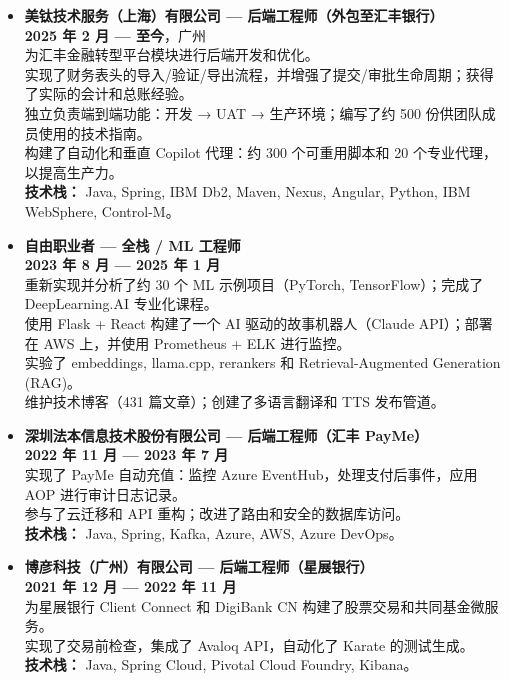 \documentclass[11pt, a4paper]{latex/awesome-cv}
\begin{document}
\Large
\begin{itemize}
    \item \textbf{美钛技术服务（上海）有限公司 — 后端工程师（外包至汇丰银行）} \\
    \textbf{2025 年 2 月 — 至今}，广州 \\
    为汇丰金融转型平台模块进行后端开发和优化。\\
    实现了财务表头的导入/验证/导出流程，并增强了提交/审批生命周期；获得了实际的会计和总账经验。\\
    独立负责端到端功能：开发 → UAT → 生产环境；编写了约 500 份供团队成员使用的技术指南。\\
    构建了自动化和垂直 Copilot 代理：约 300 个可重用脚本和 20 个专业代理，以提高生产力。\\
    \textbf{技术栈：} Java, Spring, IBM Db2, Maven, Nexus, Angular, Python, IBM WebSphere, Control-M。

    \item \textbf{自由职业者 — 全栈 / ML 工程师} \\
    \textbf{2023 年 8 月 — 2025 年 1 月} \\
    重新实现并分析了约 30 个 ML 示例项目（PyTorch, TensorFlow）；完成了 DeepLearning.AI 专业化课程。\\
    使用 Flask + React 构建了一个 AI 驱动的故事机器人（Claude API）；部署在 AWS 上，并使用 Prometheus + ELK 进行监控。\\
    实验了 embeddings, llama.cpp, rerankers 和 Retrieval-Augmented Generation (RAG)。\\
    维护技术博客（431 篇文章）；创建了多语言翻译和 TTS 发布管道。

    \item \textbf{深圳法本信息技术股份有限公司 — 后端工程师（汇丰 PayMe）} \\
    \textbf{2022 年 11 月 — 2023 年 7 月} \\
    实现了 PayMe 自动充值：监控 Azure EventHub，处理支付后事件，应用 AOP 进行审计日志记录。\\
    参与了云迁移和 API 重构；改进了路由和安全的数据库访问。\\
    \textbf{技术栈：} Java, Spring, Kafka, Azure, AWS, Azure DevOps。

    \item \textbf{博彦科技（广州）有限公司 — 后端工程师（星展银行）} \\
    \textbf{2021 年 12 月 — 2022 年 11 月} \\
    为星展银行 Client Connect 和 DigiBank CN 构建了股票交易和共同基金微服务。\\
    实现了交易前检查，集成了 Avaloq API，自动化了 Karate 的测试生成。\\
    \textbf{技术栈：} Java, Spring Cloud, Pivotal Cloud Foundry, Kibana。


\end{itemize}
\end{document}
